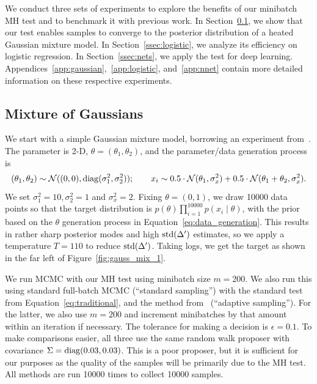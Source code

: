 \documentclass{article}
\begin{document}
We conduct three sets of experiments to explore the benefits of our minibatch MH test and to
benchmark it with previous work. In Section~\ref{ssec:gaussians}, we show that our test enables
samples to converge to the posterior distribution of a heated Gaussian mixture model. In
Section~\ref{ssec:logistic}, we analyze its efficiency on logistic regression. In
Section~\ref{ssec:nets}, we apply the test for deep learning.
Appendices~\ref{app:gaussian},~\ref{app:logistic}, and~\ref{app:nnet} contain more detailed
information on these respective experiments.

\subsection{Mixture of Gaussians}\label{ssec:gaussians}

We start with a simple Gaussian mixture model, borrowing an experiment from~\cite{langevin_2011}.
The parameter is 2-D, $\theta = (\theta_1,\theta_2)$, and the parameter/data generation process is
\begin{equation}\label{eq:data_generation}
(\theta_1,\theta_2) \sim \mathcal{N}((0,0), {\rm diag}(\sigma_1^2, \sigma_2^2));\quad \quad x_i \sim
0.5 \cdot \mathcal{N}(\theta_1, \sigma_x^2) + 0.5 \cdot \mathcal{N}(\theta_1+\theta_2, \sigma_x^2).
\end{equation}
We set $\sigma_1^2 = 10, \sigma_2^2 = 1$ and $\sigma_x^2=2$. Fixing $\theta = (0,1)$, we draw 10000
data points so that the target distribution is $p(\theta)\prod_{i=1}^{10000}p(x_i\mid \theta)$, with
the prior based on the $\theta$ generation process in Equation~\ref{eq:data_generation}. This
results in rather sharp posterior modes and high ${\rm std}(\Delta')$ estimates, so we apply a
temperature $T=110$ to reduce ${\rm std}(\Delta')$. Taking logs, we get the target as shown in the
far left of Figure~\ref{fig:gauss_mix_1}.

We run MCMC with our MH test using minibatch size $m=200$. We also run this using standard
full-batch MCMC (``standard sampling'') with the standard test from Equation~\ref{eq:traditional}, and the method
from~\cite{cutting_mh_2014} (``adaptive sampling''). For the latter, we also use $m=200$ and
increment minibatches by that amount within an iteration if necessary. The tolerance for making a
decision is $\epsilon=0.1$. To make comparisons easier, all three use the same random walk proposer
with covariance $\Sigma={\rm diag}(0.03, 0.03)$. This is a poor proposer, but it is sufficient for
our purposes as the quality of the samples will be primarily due to the MH test. All methods are run
10000 times to collect 10000 samples.
\end{document}
